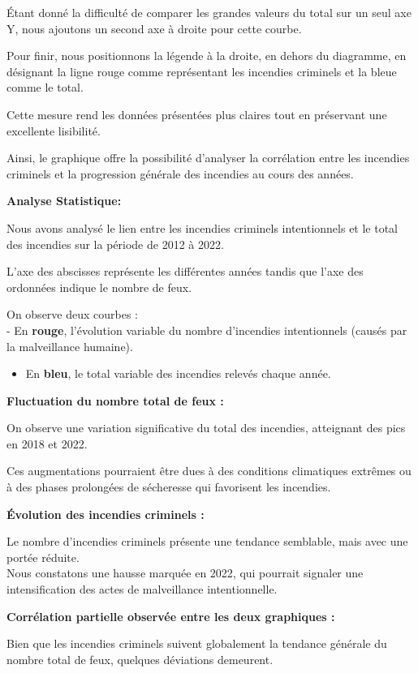 \documentclass[
]{article}
\providecommand{\tightlist}{%
  \setlength{\itemsep}{0pt}\setlength{\parskip}{0pt}}
\begin{document}
Étant donné la difficulté de comparer les grandes valeurs du total sur
un seul axe Y, nous ajoutons un second axe à droite pour cette courbe.

Pour finir, nous positionnons la légende à la droite, en dehors du
diagramme, en désignant la ligne rouge comme représentant les incendies
criminels et la bleue comme le total.

Cette mesure rend les données présentées plus claires tout en préservant
une excellente lisibilité.

Ainsi, le graphique offre la possibilité d'analyser la corrélation entre
les incendies criminels et la progression générale des incendies au
cours des années.

\textbf{Analyse Statistique:}

Nous avons analysé le lien entre les incendies criminels intentionnels
et le total des incendies sur la période de 2012 à 2022.

L'axe des abscisses représente les différentes années tandis que l'axe
des ordonnées indique le nombre de feux.

On observe deux courbes :\\
- En \textbf{rouge}, l'évolution variable du nombre d'incendies
intentionnels (causés par la malveillance humaine).

\begin{itemize}
\tightlist
\item
  En \textbf{bleu}, le total variable des incendies relevés chaque
  année.
\end{itemize}

\textbf{Fluctuation du nombre total de feux :}

On observe une variation significative du total des incendies,
atteignant des pics en 2018 et 2022.

Ces augmentations pourraient être dues à des conditions climatiques
extrêmes ou à des phases prolongées de sécheresse qui favorisent les
incendies.

\textbf{Évolution des incendies criminels :}

Le nombre d'incendies criminels présente une tendance semblable, mais
avec une portée réduite.\\
Nous constatons une hausse marquée en 2022, qui pourrait signaler une
intensification des actes de malveillance intentionnelle.

\textbf{Corrélation partielle observée entre les deux graphiques :}

Bien que les incendies criminels suivent globalement la tendance
générale du nombre total de feux, quelques déviations demeurent.
\end{document}
